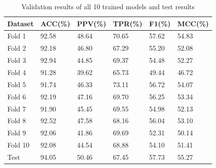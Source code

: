 \documentclass[journal=jacsat,manuscript=article]{achemso}
\begin{document}
\begin{table}
    \centering
    \begin{tabular}{| P{2cm} | P{2cm} | P{2cm} | P{2cm} | P{2cm} | P{2cm} |}
        \hline
        Dataset & ACC(\%) & PPV(\%) & TPR(\%) & F1(\%) & MCC(\%) \\
        \hline
        Fold 1  & 92.58   & 48.64   & 70.65   & 57.62  & 54.83   \\
        Fold 2  & 92.18   & 46.80   & 67.29   & 55.20  & 52.08   \\
        Fold 3  & 92.94   & 44.85   & 69.37   & 54.48  & 52.27   \\
        Fold 4  & 91.28   & 39.62   & 65.73   & 49.44  & 46.72   \\
        Fold 5  & 91.74   & 46.33   & 73.11   & 56.72  & 54.07   \\
        Fold 6  & 92.19   & 47.16   & 69.70   & 56.25  & 53.34   \\
        Fold 7  & 91.90   & 45.45   & 69.55   & 54.98  & 52.13   \\
        Fold 8  & 92.52   & 47.58   & 68.16   & 56.04  & 53.10   \\
        Fold 9  & 92.06   & 41.86   & 69.69   & 52.31  & 50.14   \\
        Fold 10 & 92.08   & 44.54   & 68.88   & 54.10  & 51.41   \\
        Test    & 94.05   & 50.46   & 67.45   & 57.73  & 55.27   \\
        \hline
    \end{tabular}
    \caption{\label{tab:results} Validation results of all 10 trained models and test results}
\end{table}
\end{document}
